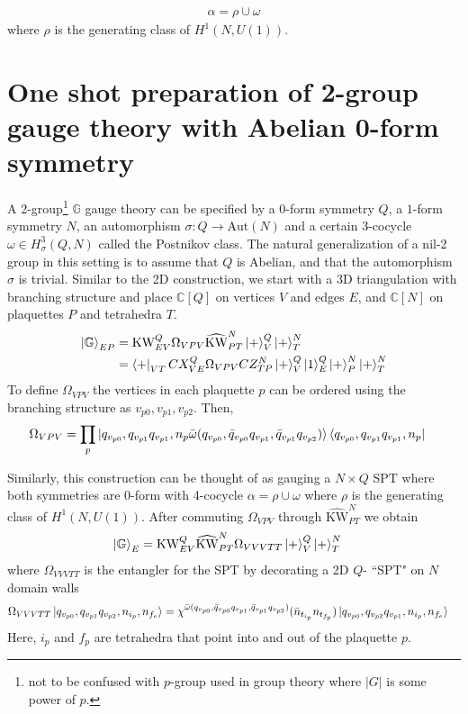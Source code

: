\documentclass[nofootinbib,prx,twocolumn,showpacs,superscriptaddress,notitlepage,amsmath,amssymb]{revtex4-2}
\theoremstyle{definition}
\def\KW{\text{KW}}
\def\KWd{\widehat{\text{KW}}}
\def\bra#1{\mathinner{\langle{#1}|}}
\def\ket#1{\mathinner{|{#1}\rangle}}
\def\CC{\mathbb C}
\begin{document}
\begin{align}
    \alpha = \rho \cup \omega
\end{align}
where $\rho$ is the generating class of $H^1(N,U(1))$.




\section{One shot preparation of 2-group gauge theory with Abelian 0-form symmetry}\label{app:2group}

A 2-group\footnote{not to be confused with $p$-group used in group theory where $|G|$ is some power of $p$.} $\mathbb G$ gauge theory can be specified by a $0$-form symmetry $Q$, a $1$-form symmetry $N$, an automorphism $\sigma: Q \rightarrow \text{Aut}(N)$ and a certain 3-cocycle $\omega\in H^3_\sigma(Q,N)$ called the Postnikov class. The natural generalization of a nil-2 group in this setting is to assume that $Q$ is Abelian, and that the automorphism $\sigma$ is trivial. Similar to the 2D construction, we start with a 3D triangulation with branching structure and place $\CC[Q]$ on vertices $V$ and edges $E$, and $\CC[N]$ on plaquettes $P$ and tetrahedra $T$.
\begin{align}
    \ket{\mathbb G}_{EP} &=\KW^Q_{EV} \Omega_{VPV} \KWd^N_{PT} \ket{+}^Q_V \ket{+}^N_T \nonumber\\
    &=\bra{+}_{VT} CX^Q_{VE}   \Omega_{VPV}    CZ^N_{TP} \ket{+}^Q_{V}\ket{1}^Q_E \ket{+}^N_P\ket{+}^N_T
\end{align}
To define $\Omega_{VPV}$ the vertices in each plaquette $p$ can be ordered using the branching structure as $v_{p0},v_{p1},v_{p2}$. Then,
\begin{align}
      \Omega_{VPV} &=\prod_p \ket{q_{v_{p0}},q_{v_{p1}} q_{v_{p1}}, n_p \bar \omega(q_{v_{p0}},\bar q_{v_{p0}}q_{v_{p1}},\bar q_{v_{p1}}q_{v_{p2}} )}\bra{q_{v_{p0}},q_{v_{p1}} q_{v_{p1}},n_p} 
\end{align}

Similarly, this construction can be thought of as gauging a $N\times Q$ SPT where both symmetries are $0$-form with 4-cocycle $\alpha = \rho \cup \omega$ where $\rho$ is the generating class of $H^1(N,U(1))$. After commuting $\Omega_{VPV}$ through $\KWd^N_{PT}$ we obtain
\begin{align}
\ket{\mathbb G}_E &=\KW^Q_{EV} \KWd^N_{PT}  \Omega_{VVVTT} \ket{+}^Q_V \ket{+}^N_T
\end{align}
where $\Omega_{VVVTT}$ is the entangler for the SPT by decorating a 2D $Q$- ``SPT" on $N$ domain walls
\begin{align}
      \Omega_{VVVTT}\ket{q_{v_{p0}},q_{v_{p1}} q_{v_{p2}},n_{{i_p}},n_{{f_e}}}  &=
      \chi^{\bar \omega(q_{v_{p0}},\bar q_{v_{p0}}q_{v_{p1}},\bar q_{v_{p1}}q_{v_{p2}} )}(\bar n_{t_{i_p}}n_{t_{f_p}})
      \ket{q_{v_{p0}},q_{v_{p2}} q_{v_{p1}},n_{{i_p}},n_{{f_e}}} 
\end{align}
Here, ${i_p}$ and ${f_p}$ are tetrahedra that point into and out of the plaquette $p$.
\end{document}
